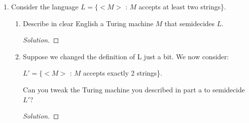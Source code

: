 \documentclass[10pt]{article}
\begin{document}
\begin{enumerate}[1)]

\item
Consider the language $L = \{<M>$ : $M$ accepts at least two strings\}.
\begin{enumerate}
\item
Describe in clear English a Turing machine $M$ that semidecides $L$.
\begin{proof}[Solution]
\end{proof}

\item
Suppose we changed the definition of L just a bit.  We now consider:
\begin{center}
$L' = \{<M>$ : $M$ accepts exactly 2 strings\}.
\end{center}
Can you tweak the Turing machine you described in part a to semidecide $L'$?
\begin{proof}[Solution]
\end{proof}
\end{enumerate}
\end{enumerate}
\end{document}
